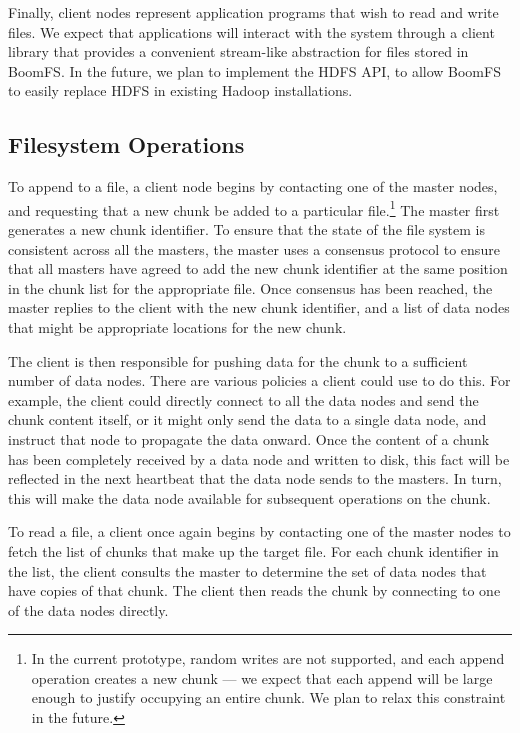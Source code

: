 \documentclass{article}
\begin{document}
Finally, client nodes represent application programs that wish to read
and write files. We expect that applications will interact with the
system through a client library that provides a convenient stream-like
abstraction for files stored in BoomFS. In the future, we plan to
implement the HDFS API, to allow BoomFS to easily replace HDFS in
existing Hadoop installations. %

\subsection{Filesystem Operations}
\label{fs-ops}
To append to a file, a client node begins by contacting one of the
master nodes, and requesting that a new chunk be added to a particular
file.\footnote{In the current prototype, random writes are not
  supported, and each append operation creates a new chunk --- we
  expect that each append will be large enough to justify occupying an
  entire chunk. We plan to relax this constraint in the future.} The
master first generates a new chunk identifier. To ensure that the
state of the file system is consistent across all the masters, the
master uses a consensus protocol to ensure that all masters have
agreed to add the new chunk identifier at the same position in the
chunk list for the appropriate file. Once consensus has been reached,
the master replies to the client with the new chunk identifier, and a
list of data nodes that might be appropriate locations for the new
chunk.

The client is then responsible for pushing data for the chunk to a
sufficient number of data nodes. There are various policies a client
could use to do this. For example, the client could directly connect
to all the data nodes and send the chunk content itself, or it might
only send the data to a single data node, and instruct that node to
propagate the data onward. Once the content of a chunk has been
completely received by a data node and written to disk, this fact will
be reflected in the next heartbeat that the data node sends to the
masters. In turn, this will make the data node available for
subsequent operations on the chunk.

To read a file, a client once again begins by contacting one of the
master nodes to fetch the list of chunks that make up the target
file. For each chunk identifier in the list, the client consults the
master to determine the set of data nodes that have copies of that
chunk. The client then reads the chunk by connecting to one of the
data nodes directly.
\end{document}
